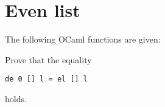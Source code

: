 \section{Even list}
The following OCaml functions are given:

Prove that the equality
\begin{center}
    \begin{lstlisting}
de 0 [] l = el [] l\end{lstlisting}
\end{center}
holds.